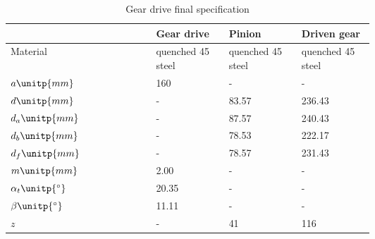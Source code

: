 \begin{table}[ht]
	\centering
	\caption{Gear drive final specification}
	\begin{tabular}{lp{0.2\linewidth}p{0.2\linewidth}p{0.2\linewidth}}\toprule
		& Gear drive & Pinion & Driven gear \\ \midrule
		Material 			&	quenched 45 steel&	quenched 45 steel&	quenched 45 steel\\
		$ a\unitp{mm}    $	&	160	&	-		&	-		\\
		$ d\unitp{mm}    $	&	-		&	83.57	&	236.43	\\
		$ d_a\unitp{mm}  $	&	-		&	87.57	&	240.43	\\
		$ d_b\unitp{mm}  $	&	-		&	78.53	&	222.17	\\
		$ d_f\unitp{mm}  $	&	-		&	78.57	&	231.43	\\
		$ m\unitp{mm}    $	&	2.00	&	-		&	-		\\
		$ \alpha_t\unitp{^\circ}    $	&	20.35	&	-		&	-		\\
		$ \beta\unitp{^\circ}    $	&	11.11	&	-		&	-		\\
		$ z  $	&	-		&	41	&	116	\\
		\bottomrule
	\end{tabular}
\end{table}